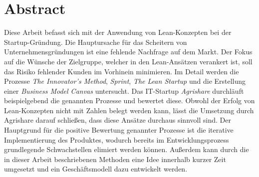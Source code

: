 \chapter*{Abstract}
Diese Arbeit befasst sich mit der Anwendung von Lean-Konzepten bei der Startup-Gründung. Die Hauptursache für das Scheitern von Unternehmensgründungen ist eine fehlende Nachfrage auf dem Markt. Der Fokus auf die Wünsche der Zielgruppe, welcher in den Lean-Ansätzen verankert ist, soll das Risiko fehlender Kunden im Vorhinein minimieren. Im Detail werden die Prozesse \textit{The Innovator's Method}, \textit{Sprint}, \textit{The Lean Startup} und die Erstellung einer \textit{Business Model Canvas} untersucht. Das IT-Startup \textit{Agrishare} durchläuft beispielgebend die genannten Prozesse und bewertet diese. Obwohl der Erfolg von Lean-Konzepten nicht mit Zahlen belegt werden kann, lässt die Umsetzung durch Agrishare darauf schließen, dass diese Ansätze durchaus sinnvoll sind. Der Hauptgrund für die positive Bewertung genannter Prozesse ist die iterative Implementierung des Produktes, wodurch bereits im Entwicklungsprozess grundlegende Schwachstellen elimiert werden können. Außerdem kann durch die in dieser Arbeit beschriebenen Methoden eine Idee innerhalb kurzer Zeit umgesetzt und ein Geschäftsmodell dazu entwickelt werden.